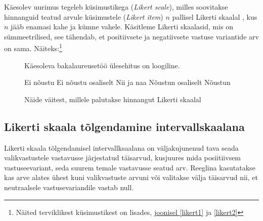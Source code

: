 \documentclass[a4paper,12pt,oneside]{article}
\numberwithin{equation}{section}
\theoremstyle{definition}
\begin{document}
Käesolev uurimus tegeleb k\"usimustikega (\textit{Likert scale}),  milles soovitakse hinnanguid teatud arvule küsimustele (\textit{Likert item}) $n$ pallisel Likerti skaalal \cite{Edmondson}, kus $n$ jääb enamasi kahe ja kümne vahele.  Käsitleme Likerti skaalasid, mis on sümmeetrilised, see tähendab, et positiivsete ja negatiivsete vastuse variantide arv on sama. Näiteks:\footnote{Näited terviklikest k\"usimustikest on lisades, \hyperref[likert1]{joonisel \ref*{likert1}} ja \hyperref[likert2]{ \ref*{likert2}}}

\vspace{10pt}

\begin{figure}[H]


\colorbox{background_example}{\parbox{\textwidth}{

\vspace{1mm}

Käesoleva bakalaureusetöö \"ulesehitus on loogiline.

\vspace{5pt}

\begin{Form}
\def\DefaultWidthofChoiceMenu{12pt}%


\small{
	\CheckBox[bordercolor = gray,name=optionE]{\mbox{}} Ei nõustu 
	\CheckBox[bordercolor = gray,name=optionD]{\mbox{}} Ei nõustu osaliselt
	\CheckBox[bordercolor = gray,name=optionC]{\mbox{}} Nii ja naa
	\CheckBox[bordercolor = gray,name=optionC]{\mbox{}}  Nõustun osaliselt
	\CheckBox[checked,bordercolor = gray,name=optionC]{\mbox{}} Nõustun
}


\end{Form}}}
\caption{Näide väitest, millele palutakse hinnangut Likerti skaalal}
\label{likert_question}
\end{figure}

\subsection{Likerti skaala tõlgendamine intervallskaalana}

Likerti skaala tõlgendamisel intervallksaalana on väljakujunenud tava seada valikvastustele vastavusse järjestatud täisarvud, kusjuures mida posiitiivsem vastuseevariant, seda suurem temale vastavusse seatud arv. Reeglina kasutatakse kas arve alates ühest kuni valikvastuste arvuni või valitakse välja täisarvud nii, et neutraalsele vastusevariandile vastab null.
\end{document}
